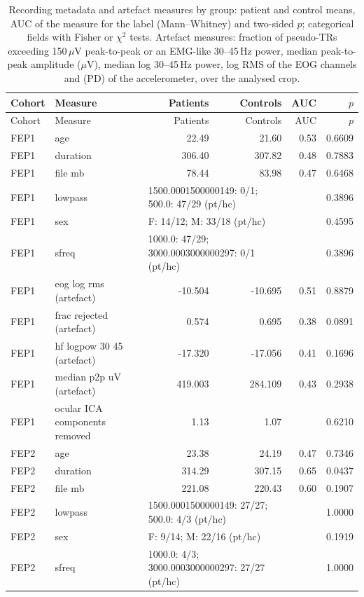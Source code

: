 \documentclass[10pt]{article}
\begin{document}
\begin{longtable}{l l r r r r}
\caption{Recording metadata and artefact measures by group: patient and control means, AUC of the measure for the label (Mann--Whitney) and two-sided $p$; categorical fields with Fisher or $\chi^2$ tests. Artefact measures: fraction of pseudo-TRs exceeding 150\,$\mu$V peak-to-peak or an EMG-like 30--45\,Hz power, median peak-to-peak amplitude ($\mu$V), median log 30--45\,Hz power, log RMS of the EOG channels and (PD) of the accelerometer, over the analysed crop.}\label{tab:s_meta}\\
\toprule
Cohort & Measure & Patients & Controls & AUC & $p$ \\
\midrule
\endfirsthead
\toprule
Cohort & Measure & Patients & Controls & AUC & $p$ \\
\midrule
\endhead
FEP1 & age & 22.49 & 21.60 & 0.53 & 0.6609 \\
FEP1 & duration & 306.40 & 307.82 & 0.48 & 0.7883 \\
FEP1 & file mb & 78.44 & 83.98 & 0.47 & 0.6468 \\
FEP1 & lowpass & \multicolumn{2}{l}{1500.0001500000149: 0/1; 500.0: 47/29 (pt/hc)} & & 0.3896 \\
FEP1 & sex & \multicolumn{2}{l}{F: 14/12; M: 33/18 (pt/hc)} & & 0.4595 \\
FEP1 & sfreq & \multicolumn{2}{l}{1000.0: 47/29; 3000.0003000000297: 0/1 (pt/hc)} & & 0.3896 \\
FEP1 & eog log rms (artefact) & -10.504 & -10.695 & 0.51 & 0.8879 \\
FEP1 & frac rejected (artefact) & 0.574 & 0.695 & 0.38 & 0.0891 \\
FEP1 & hf logpow 30 45 (artefact) & -17.320 & -17.056 & 0.41 & 0.1696 \\
FEP1 & median p2p uV (artefact) & 419.003 & 284.109 & 0.43 & 0.2938 \\
FEP1 & ocular ICA components removed & 1.13 & 1.07 & & 0.6210 \\
\midrule
FEP2 & age & 23.38 & 24.19 & 0.47 & 0.7346 \\
FEP2 & duration & 314.29 & 307.15 & 0.65 & 0.0437 \\
FEP2 & file mb & 221.08 & 220.43 & 0.60 & 0.1907 \\
FEP2 & lowpass & \multicolumn{2}{l}{1500.0001500000149: 27/27; 500.0: 4/3 (pt/hc)} & & 1.0000 \\
FEP2 & sex & \multicolumn{2}{l}{F: 9/14; M: 22/16 (pt/hc)} & & 0.1919 \\
FEP2 & sfreq & \multicolumn{2}{l}{1000.0: 4/3; 3000.0003000000297: 27/27 (pt/hc)} & & 1.0000 \\

\end{longtable}
\end{document}
